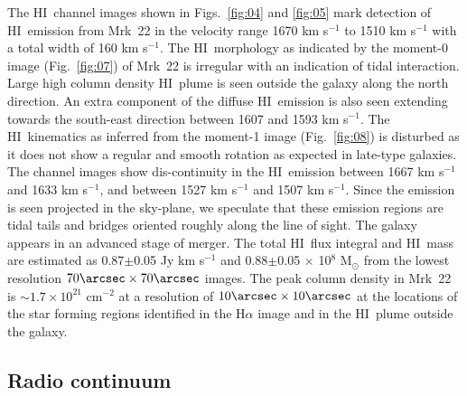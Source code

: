 \documentclass[useAMS,usenatbib]{mn2e}
\def\HI{H{\small{I}}~}
\begin{document}
The \HI channel images shown in Figs.~\ref{fig:04} and \ref{fig:05} mark detection of \HI emission from Mrk~22 in the velocity range 1670 km s$^{-1}$ to 1510 km s$^{-1}$ with a total width of 160 km s$^{-1}$. The \HI morphology as indicated by the moment-0 image (Fig.~\ref{fig:07}) of Mrk~22 is irregular with an indication of tidal interaction. Large high column density \HI plume is seen outside the galaxy along the north direction. An extra component of the diffuse \HI emission is also seen extending towards the south-east direction between 1607 and 1593 km s$^{-1}$. The \HI kinematics as inferred from the moment-1 image (Fig.~\ref{fig:08}) is disturbed as it does not show a regular and smooth rotation as expected in late-type galaxies. The channel images show dis-continuity in the \HI emission between 1667 km s$^{-1}$ and 1633 km s$^{-1}$, and between 1527 km s$^{-1}$ and 1507 km s$^{-1}$. Since the emission is seen projected in the sky-plane, we speculate that these emission regions are tidal tails and bridges oriented roughly along the line of sight. The galaxy appears in an advanced stage of merger. The total \HI flux integral and \HI mass are estimated as 0.87$\pm$0.05 Jy km s$^{-1}$ and 0.88$\pm$0.05 $\times$ 10$^{8}$ M$_{\odot}$ from the lowest resolution $70\arcsec \times 70\arcsec$ images. The peak column density in Mrk~22 is $\sim1.7 \times 10^{21}$ cm$^{-2}$ at a resolution of $10\arcsec \times 10\arcsec$ at the locations of the star forming regions identified in the H${\alpha}$ image and in the \HI plume outside the galaxy. 

\subsection{Radio continuum} 
\end{document}

